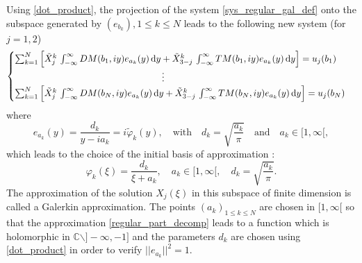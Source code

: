 Using \eqref{dot_product}, the projection of the system \eqref{sys_regular_gal_def} onto the subspace generated by $(e_{b_k}), 1\leq k\leq N$ leads to the following new system (for $j=1,2$)
\begin{equation}
\label{sys_regular_gal_col}
\begin{cases}
\sum_{k=1}^N \left[ \tilde{X}_j^k \, \int_{-\infty}^\infty DM(b_1,iy) e_{a_k}(y) \, {\rm d} y + \tilde{X}_{3-j}^k \, \int_{-\infty}^\infty TM(b_1,iy) e_{a_k}(y) \, {\rm d} y \right] = u_j(b_1) \\
 \qquad \qquad \qquad \qquad \qquad \qquad \qquad \qquad \vdots \\
\sum_{k=1}^N \left[ \tilde{X}_j^k \, \int_{-\infty}^\infty DM(b_N,iy) e_{a_k}(y) \, {\rm d} y + \tilde{X}_{3-j}^k \, \int_{-\infty}^\infty TM(b_N,iy) e_{a_k}(y) \, {\rm d} y \right] = u_j(b_N)
\end{cases}
\end{equation}
where
\begin{equation}
\label{Galerkin_basis}
e_{a_k}(y) = \dfrac{d_k}{y-i{a_k}}=i\tilde \varphi_k(y), \quad \text{with} \quad d_k=\sqrt{\frac{a_k}{\pi}} \quad \text{and} \quad a_k \in [1,\infty[,
\end{equation}
which leads to the choice of the initial basis of approximation :
\begin{equation}
\label{Gal_basis}
\varphi_k(\xi) = \dfrac{d_k}{\xi + a_k}, \quad a_k \in [1,\infty[, \quad d_k=\sqrt{\frac{a_k}{\pi}}.
\end{equation}
The approximation of the solution $X_j(\xi)$ in this subspace of finite dimension is called a Galerkin approximation. The points $(a_k)_{1\leq k \leq N}$ are chosen in $[1,\infty[$ so that the approximation \eqref{regular_part_decomp} leads to a function which is holomorphic in $\mathbb{C}\backslash\rbrack-\infty,-1\rbrack$ and the parameters $d_k$ are chosen using \eqref{dot_product} in order to verify $||e_{a_k}||^2=1$.


